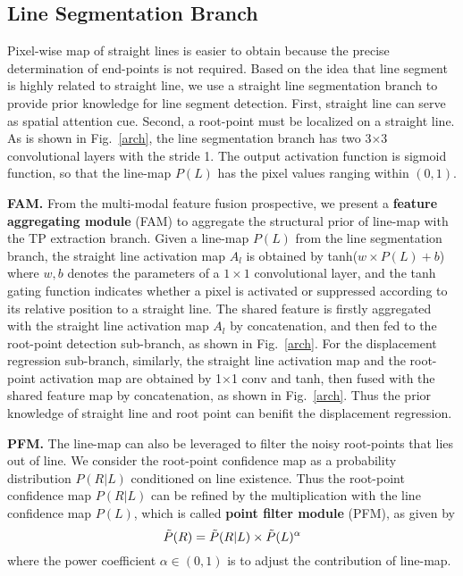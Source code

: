\documentclass[runningheads]{llncs}
\begin{document}
\subsection{Line Segmentation Branch}
Pixel-wise map of straight lines is easier to obtain because the precise determination of end-points is not required. Based on the idea that line segment is highly related to straight line, we use a straight line segmentation branch to provide prior knowledge for line segment detection. First, straight line can serve as spatial attention cue. Second, a root-point must be localized on a straight line. As is shown in Fig.~\ref{arch}, the line segmentation branch has two 3$\times$3 convolutional layers with the stride 1. The output activation function is sigmoid function, so that the line-map $P(L)$ has the pixel values ranging within $(0,1)$.

\textbf{FAM.}
From the multi-modal feature fusion prospective, we present a \textbf{feature aggregating module} (FAM) to aggregate the structural prior of line-map with the TP extraction branch. Given a line-map $P(L)$ from the line segmentation branch, the straight line activation map $A_l$ is obtained by tanh($w\times P(L)+b$) where $w, b$ denotes the parameters of a $1 \times 1$ convolutional layer, and the tanh gating function indicates whether a pixel is activated or suppressed according to its relative position to a straight line. The shared feature is firstly aggregated with the straight line activation map $A_l$ by concatenation, and then fed to the root-point detection sub-branch, as shown in Fig.~\ref{arch}.
For the displacement regression sub-branch, similarly, the straight line activation map and the root-point activation map are obtained by 1$\times$1 conv and tanh, then fused with the shared feature map by concatenation, as shown in Fig.~\ref{arch}. Thus the prior knowledge of straight line and root point can benifit the displacement regression.


\textbf{PFM.}
The line-map can also be leveraged to filter the noisy root-points that lies out of line. We consider the root-point confidence map as a probability distribution $P(R|L)$ conditioned on line existence. Thus the root-point confidence map $P(R|L)$ can be refined by the multiplication with the line confidence map $P(L)$, which is called \textbf{point filter module} (PFM), as given by
\begin{equation}
\Tilde{P}(R) = \Tilde{P}(R|L) \times \Tilde{P}(L) ^ \alpha
\label{combine}
\end{equation}
where the power coefficient $\alpha\in (0,1)$ is to adjust the contribution of line-map.
\end{document}
